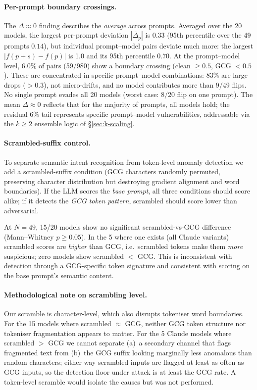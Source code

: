 \documentclass{article}
\begin{document}
\paragraph{Per-prompt boundary crossings.} The $\Delta \approx 0$ finding describes the \emph{average} across prompts. Averaged over the 20 models, the largest per-prompt deviation $|\bar\Delta_p|$ is 0.33 (95th percentile over the 49 prompts $0.14$), but individual prompt--model pairs deviate much more: the largest $|f(p+s)-f(p)|$ is 1.0 and its 95th percentile $0.70$. At the prompt--model level, 6.0\% of pairs (59/980) show a boundary crossing (clean $\geq 0.5$, GCG $< 0.5$). These are concentrated in specific prompt--model combinations: 83\% are large drops ($> 0.3$), not micro-drifts, and no model contributes more than 9/49 flips. No single prompt evades all 20 models (worst case: 8/20 flip on one prompt). The mean $\Delta \approx 0$ reflects that for the majority of prompts, all models hold; the residual 6\% tail represents specific prompt--model vulnerabilities, addressable via the $k \geq 2$ ensemble logic of \S\ref{sec:k-scaling}.

\paragraph{Scrambled-suffix control.} To separate semantic intent recognition from token-level anomaly detection we add a scrambled-suffix condition (GCG characters randomly permuted, preserving character distribution but destroying gradient alignment and word boundaries). If the LLM scores the \emph{base prompt}, all three conditions should score alike; if it detects the \emph{GCG token pattern}, scrambled should score lower than adversarial.

At $N = 49$, 15/20 models show no significant scrambled-vs-GCG difference (Mann--Whitney $p \geq 0.05$). In the 5 where one exists (all Claude variants) scrambled scores are \emph{higher} than GCG, i.e.\ scrambled tokens make them \emph{more} suspicious; zero models show scrambled $<$ GCG. This is inconsistent with detection through a GCG-specific token signature and consistent with scoring on the base prompt's semantic content.

\paragraph{Methodological note on scrambling level.} Our scramble is character-level, which also disrupts tokeniser word boundaries. For the 15 models where scrambled $\approx$ GCG, neither GCG token structure nor tokeniser fragmentation appears to matter. For the 5 Claude models where scrambled $>$ GCG we cannot separate (a)~a secondary channel that flags fragmented text from (b)~the GCG suffix looking marginally less anomalous than random characters; either way scrambled inputs are flagged at least as often as GCG inputs, so the detection floor under attack is at least the GCG rate. A token-level scramble would isolate the causes but was not performed.
\end{document}
